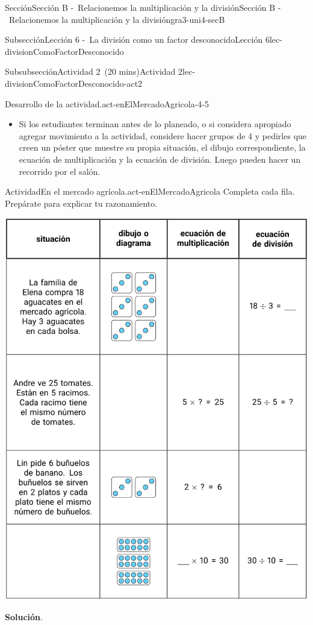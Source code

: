 \documentclass[oneside,10pt,]{article}
\newcommand{\blocktitlefont}{\relax}
\begin{document}
\begin{sectionptx}{Sección}{Sección B -~Relacionemos la multiplicación y la división}{}{Sección B -~Relacionemos la multiplicación y la división}{}{}{gra3-uni4-secB}
\begin{subsectionptx}{Subsección}{Lección 6 -~La división como un factor desconocido}{}{Lección 6}{}{}{lec-divisionComoFactorDesconocido}
\begin{subsubsectionptx}{Subsubsección}{Actividad 2~(20 mins)}{}{Actividad 2}{}{}{lec-divisionComoFactorDesconocido-act2}
\begin{paragraphs}{Desarrollo de la actividad.}{act-enElMercadoAgricola-4-5}
\begin{itemize}[label=\textbullet]
\item{}Si los estudiantes terminan antes de lo planeado, o si considera apropiado agregar movimiento a la actividad, considere hacer grupos de 4 y pedirles que creen un póster que muestre su propia situación, el dibujo correspondiente, la ecuación de multiplicación y la ecuación de división. Luego pueden hacer un recorrido por el salón.%
\end{itemize}
\end{paragraphs}%
\begin{activity}{Actividad}{En el mercado agrícola.}{act-enElMercadoAgricola}%
Completa cada fila. Prepárate para explicar tu razonamiento.%
\begin{image}{0}{1}{0}{}%
\includegraphics[width=\linewidth]{external/tikz-source/enElMercadoAgricola-tab.pdf}
\end{image}%
\par\smallskip%
\noindent\textbf{\blocktitlefont Solución}.\hypertarget{act-enElMercadoAgricola-3}{}\quad{}\begin{image}{0}{1}{0}{}%

\end{image}
\end{activity}
\end{subsubsectionptx}
\end{subsectionptx}
\end{sectionptx}
\end{document}
